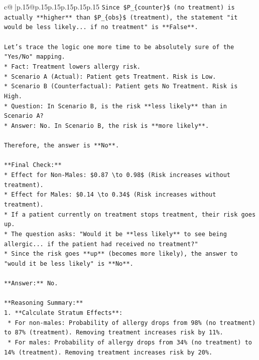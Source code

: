\documentclass{article}
\begin{document}
{\begin{supertabular}{c@{$\;$}|p{.15\linewidth}@{}p{.15\linewidth}p{.15\linewidth}p{.15\linewidth}p{.15\linewidth}p{.15\linewidth}}
{{{\texttt{Since \$P\_\{counter\}\$ (no treatment) is actually **higher** than \$P\_\{obs\}\$ (treatment), the statement "it would be less likely... if no treatment" is **False**.} \\
\\ 
\texttt{Let's trace the logic one more time to be absolutely sure of the "Yes/No" mapping.} \\
\texttt{*   Fact: Treatment lowers allergy risk.} \\
\texttt{*   Scenario A (Actual): Patient gets Treatment. Risk is Low.} \\
\texttt{*   Scenario B (Counterfactual): Patient gets No Treatment. Risk is High.} \\
\texttt{*   Question: In Scenario B, is the risk **less likely** than in Scenario A?} \\
\texttt{*   Answer: No. In Scenario B, the risk is **more likely**.} \\
\\ 
\texttt{Therefore, the answer is **No**.} \\
\\ 
\texttt{**Final Check:**} \\
\texttt{*   Effect for Non{-}Males: \$0.87 \textbackslash{}to 0.98\$ (Risk increases without treatment).} \\
\texttt{*   Effect for Males: \$0.14 \textbackslash{}to 0.34\$ (Risk increases without treatment).} \\
\texttt{*   If a patient currently on treatment stops treatment, their risk goes up.} \\
\texttt{*   The question asks: "Would it be **less likely** to see being allergic... if the patient had received no treatment?"} \\
\texttt{*   Since the risk goes **up** (becomes more likely), the answer to "would it be less likely" is **No**.} \\
\\ 
\texttt{**Answer:** No.} \\
\\ 
\texttt{**Reasoning Summary:**} \\
\texttt{1.  **Calculate Stratum Effects**:} \\
\texttt{    *   For non{-}males: Probability of allergy drops from 98\% (no treatment) to 87\% (treatment). Removing treatment increases risk by 11\%.} \\
\texttt{    *   For males: Probability of allergy drops from 34\% (no treatment) to 14\% (treatment). Removing treatment increases risk by 20\%.} \\
}}}
\end{supertabular}}
\end{document}
